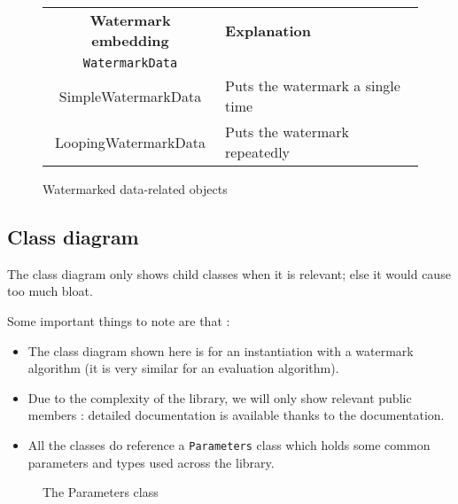 \begin{figure}[ht!]
\centering
\begin{tabular}{|c|l|}
\hline
\textbf{Watermark embedding} & \textbf{Explanation} \\
\texttt{WatermarkData} & \\
\hline
SimpleWatermarkData & Puts the watermark a single time \\   
LoopingWatermarkData & Puts the watermark repeatedly \\
\hline
\end{tabular}
\caption{Watermarked data-related objects}
\end{figure}

\newpage

\subsection{Class diagram}

The class diagram only shows child classes when it is relevant; else it would cause too much bloat.

Some important things to note are that :
\begin{itemize}
\item The class diagram shown here is for an instantiation with a watermark algorithm (it is very similar for an evaluation algorithm). 
\item Due to the complexity of the library, we will only show relevant public members : detailed documentation is available thanks to the  documentation.
\item All the classes do reference a \texttt{Parameters} class which holds some common parameters and types used across the library.
\end{itemize}


\begin{figure}[ht!]
\centering
\label{parametersclass}

\caption{The Parameters class}
\end{figure}

